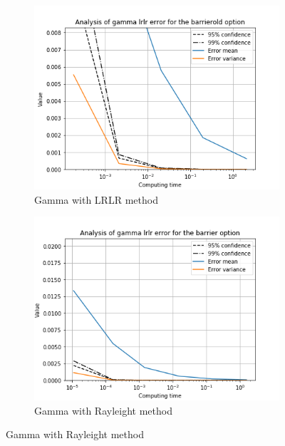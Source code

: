 \documentclass[11pt,a4paper,fleqn]{article}
\begin{document}
\begin{figure}[h!]
      \begin{subfigure}[b]{0.45\textwidth}
          \includegraphics[width=\textwidth]{graphs/barrieroldgammalrlrtime.png}
          \caption{Gamma with LRLR method}
      \end{subfigure}
      \begin{subfigure}[b]{0.45\textwidth}
          \includegraphics[width=\textwidth]{graphs/barriergammalrlrtime.png}
          \caption{Gamma with Rayleight method}
      \end{subfigure}


\end{figure}
\end{document}
